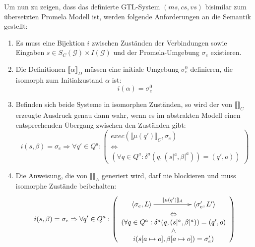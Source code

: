 Um nun zu zeigen, dass das definierte GTL-System $(ms,cs,vs)$ bisimilar zum übersetzten Promela Modell ist, werden folgende Anforderungen an die Semantik gestellt:
\begin{enumerate}
\item Es muss eine Bijektion $i$ zwischen Zuständen der Verbindungen sowie Eingaben $s\in S_C(\mathcal{G})\times I(\mathcal{G})$ und der Promela-Umgebung $\sigma_e$ existieren.
\item Die Definitionen $\llbracket \alpha \rrbracket_D$ müssen eine initiale Umgebung $\sigma_e^0$ definieren, die isomorph zum Initialzustand $\alpha$ ist: 
  \begin{equation}
    i(\alpha) = \sigma_e^0
    \label{eq:assert0}
  \end{equation}
\item Befinden sich beide Systeme in isomorphen Zuständen, so wird der von $\llbracket \rrbracket_C$ erzeugte Ausdruck genau dann wahr, wenn es im abstrakten Modell einen entsprechenden Übergang zwischen den Zuständen gibt:
  \begin{equation}
    i(s,\beta) = \sigma_e \Rightarrow \forall q'\in Q^a: \left(
      \begin{array}{c}
        \mathit{exec}(\llbracket \mu(q')\rrbracket_C,\sigma_e) \\
        \Leftrightarrow\\
        (\forall q\in Q^a: \delta^a(q,(s|^a,\beta|^a))=(q',o))
    \end{array}\right)
    \label{eq:assert1}
  \end{equation}
\item Die Anweisung, die von $\llbracket \rrbracket_A$ generiert wird, darf nie blockieren und muss isomorphe Zustände beibehalten:
  \begin{equation}
    i(s,\beta) = \sigma_e \Rightarrow \forall q'\in Q^a: \left(
      \begin{array}{c}
        \xymatrix{ \left<\sigma_e,L\right> \ar[rr]^-{\llbracket \mu(q')\rrbracket_A} & & \left<\sigma_e',L'\right> } \\
        \Leftrightarrow\\
        (\forall q\in Q^a: \delta^a(q,(s|^a,\beta|^a)) = (q',o)\\
        \land\\
        i(s[a\mapsto o],\beta[a\mapsto o]) = \sigma_e')
      \end{array}\right)
     \label{eq:assert2}
  \end{equation}
\end{enumerate}
